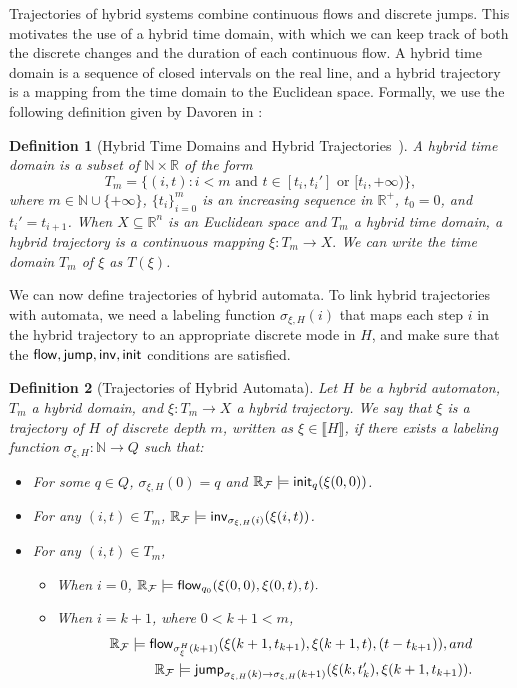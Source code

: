 \documentclass[journal]{IEEEtran}
\newtheorem{definition}{Definition}
\begin{document}
Trajectories of hybrid systems combine continuous flows and discrete jumps. This motivates the use of a hybrid time domain, with which we can keep track of both the discrete changes and the duration of each continuous flow. A hybrid time domain is a sequence of closed intervals on the real line, and a hybrid trajectory is a mapping from the time domain to the Euclidean space. Formally, we use the following definition given by Davoren in \cite{DBLP:conf/hybrid/Davoren09}:
\begin{definition}[Hybrid Time Domains and Hybrid Trajectories~\cite{DBLP:conf/hybrid/Davoren09}]
A {\em hybrid time domain} is a subset of
 $\mathbb{N}\times \mathbb{R}$ of the form
$$T_m=\{(i, t): i<m \mbox{ and } t\in [t_i, t_i']\mbox{ or }[t_i, +\infty)\},$$
where $m\in \mathbb{N}\cup\{+\infty\}$, $\{t_i\}_{i=0}^m$ is an
increasing sequence in $\mathbb{R}^+$, $t_0= 0$, and $t_i'=t_{i+1}$. When $X\subseteq\mathbb{R}^n$ is an Euclidean space and $T_m$ a hybrid
time domain, a {\em hybrid trajectory} is a {\em continuous} mapping $\xi: T_m\rightarrow X.$ We can write the time domain $T_m$ of $\xi$ as $T(\xi)$.
 \end{definition}
We can now define trajectories of hybrid automata. To link hybrid trajectories with automata, we need a labeling function $\sigma_{\xi,H}(i)$ that maps each step $i$ in the hybrid trajectory to an appropriate discrete mode in $H$, and make sure that the $\mathsf{flow}, \mathsf{jump}, \mathsf{inv}, \mathsf{init}$ conditions are satisfied.
\begin{definition}[Trajectories of Hybrid Automata]\label{trajec}
Let $H$ be a hybrid automaton, $T_m$ a hybrid domain, and $\xi: T_m\rightarrow X$ a hybrid trajectory.
We say that $\xi$ is {\em a trajectory of $H$ of discrete depth $m$}, written as $\xi\in \llbracket H \rrbracket$, if there
exists a {\em labeling function} $\sigma_{\xi,H}: \mathbb{N}\rightarrow Q$ such
that:
\begin{itemize}
\item For some $q\in Q$, $\sigma_{\xi,H}(0) = q$ and $\mathbb{R}_{\mathcal{F}}\models \mathsf{init}_{q}(\xi(0,0))$.
\item For any $(i, t)\in T_m$, $\mathbb{R}_{\mathcal{F}}\models \mathsf{inv}_{\sigma_{\xi,H}(i)} (\xi(i,t))$.
\item For any $(i,t)\in T_m$,
\begin{itemize}
\item When $i=0$, $\mathbb{R}_{\mathcal{F}}\models\mathsf{flow}_{q_0}(\xi(0,0), \xi(0,t), t).$
\item When $i = k+1$, where $0<k+1<m$,
\begin{eqnarray*}
& &\mathbb{R}_{\mathcal{F}}\models\mathsf{flow}_{\sigma^H_{\xi}(k+1)}(\xi(k+1, t_{k+1}), \xi(k+1, t), (t - t_{k+1})), and\\
& &\mathbb{R}_{\mathcal{F}}\models \mathsf{jump}_{\sigma_{\xi,H}(k)\rightarrow\sigma_{\xi,H}(k+1)}(\xi(k, t_k'), \xi(k+1,t_{k+1})).
\end{eqnarray*}
\end{itemize}
\end{itemize}
\end{definition}
\end{document}
